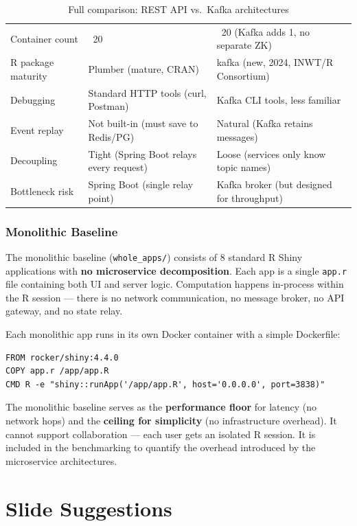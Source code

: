\documentclass[12pt,a4paper]{article}
\begin{document}
\begin{table}[h]
\begin{tabular}{@{}p{3.5cm}p{5.5cm}p{5.5cm}@{}}
Container count & ~20 & ~20 (Kafka adds 1, no separate ZK) \\
R package maturity & Plumber (mature, CRAN) & kafka (new, 2024, INWT/R Consortium) \\
Debugging & Standard HTTP tools (curl, Postman) & Kafka CLI tools, less familiar \\
Event replay & Not built-in (must save to Redis/PG) & Natural (Kafka retains messages) \\
Decoupling & Tight (Spring Boot relays every request) & Loose (services only know topic names) \\
Bottleneck risk & Spring Boot (single relay point) & Kafka broker (but designed for throughput) \\
\bottomrule
\end{tabular}
\caption{Full comparison: REST API vs.\ Kafka architectures}
\end{table}

\section{Monolithic Baseline}

The monolithic baseline (\texttt{whole\_apps/}) consists of 8 standard R Shiny applications with \textbf{no microservice decomposition}. Each app is a single \texttt{app.r} file containing both UI and server logic. Computation happens in-process within the R session --- there is no network communication, no message broker, no API gateway, and no state relay.

Each monolithic app runs in its own Docker container with a simple Dockerfile:

\begin{verbatim}
FROM rocker/shiny:4.4.0
COPY app.r /app/app.R
CMD R -e "shiny::runApp('/app/app.R', host='0.0.0.0', port=3838)"
\end{verbatim}

The monolithic baseline serves as the \textbf{performance floor} for latency (no network hops) and the \textbf{ceiling for simplicity} (no infrastructure overhead). It cannot support collaboration --- each user gets an isolated R session. It is included in the benchmarking to quantify the overhead introduced by the microservice architectures.

\newpage

\part{Slide Suggestions}
\end{document}
